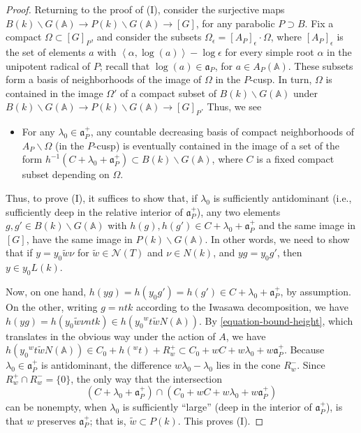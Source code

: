 \begin{proof}
Returning to the proof of (I), consider the surjective maps $B(k)\backslash G(\mathbb A)\to P(k)\backslash G(\mathbb A) \to [G]$, for any parabolic $P\supset B$. Fix a compact $\Omega\subset [G]_P$, and consider the subsets $\Omega_\epsilon= [A_P]_\epsilon \cdot \Omega$, where $[A_P]_{\epsilon}$ is the set of elements $a$ with $\left< \alpha,\log(a)\right> -\log \epsilon$ for every simple root $\alpha$ in the unipotent radical of $P$; recall that $\log(a)\in\mathfrak a_P$, for $a\in A_P(\mathbb A)$. These subsets form a basis of neighborhoods of the image of $\Omega$ in the $P$-cusp. In turn, $\Omega$ is contained in the image $\Omega'$ of a compact subset of $B(k)\backslash G(\mathbb A)$ under $B(k)\backslash G(\mathbb A)\to P(k)\backslash G(\mathbb A) \to [G]_P$. Thus, we see
\begin{itemize}
 \item For any $\lambda_0  \in \mathfrak a_P^+$, any countable decreasing basis of compact neighborhoods of $A_P\backslash \Omega$ (in the $P$-cusp) is eventually contained in  the image of a set of the form $h^{-1} (C+\lambda_0 + \mathfrak a_P^+)\subset B(k)\backslash G(\mathbb A)$, where $C$ is a fixed compact subset depending on $\Omega$. 
\end{itemize}

Thus, to prove (I), it suffices to show that, if $\lambda_0$ is sufficiently antidominant (i.e., sufficiently deep in the relative interior of $\mathfrak a_P^+$), any two elements $g, g'\in B(k)\backslash G(\mathbb A)$ with $h(g), h(g')\in C+\lambda_0 + \mathfrak a_P^+$ and the same image in $[G]$, have the same image in $P(k)\backslash G(\mathbb A)$. In other words, we need to show that if $y = y_0 \tilde w \nu$ for $\tilde w\in \mathcal N(T)$ and $\nu\in N(k)$, and $y g = y_0 g'$, then $y \in  y_0 L(k)$. 

Now, on one hand, $h(y g) = h(y_0 g') =  h(g') \in C+\lambda_0 + \mathfrak a_P^+$, by assumption. On the other, writing $g = n t k$ according to the Iwasawa decomposition, we have $h(yg) = h(y_0 \tilde w \nu ntk) \in h(y_0 {^wt} \tilde w N(\mathbb A))$. By \eqref{equation-bound-height}, which translates in the obvious way under the action of $A$, we have $h(y_0 {^wt} \tilde w N(\mathbb A)) \in C_0 + h({^wt}) + R_w^+ \subset C_0 + wC+ w\lambda_0 + w\mathfrak a_P^+$. 
Because $\lambda_0 \in \mathfrak a_P^+$ is antidominant, the difference $w\lambda_0 -\lambda_0$ lies in the cone $R_w^-$. Since $R_w^+\cap R_w^- = \{0\}$, the only way that the intersection 
$$(C+\lambda_0 + \mathfrak a_P^+) \cap  (C_0 + wC+ w\lambda_0 + w\mathfrak a_P^+)$$
can be nonempty, when $\lambda_0$ is sufficiently ``large'' (deep in the interior of $\mathfrak a_P^+$), is that $w$ preserves $\mathfrak a_P^+$; that is, $\tilde w\subset P(k)$. This proves (I).


\end{proof}
